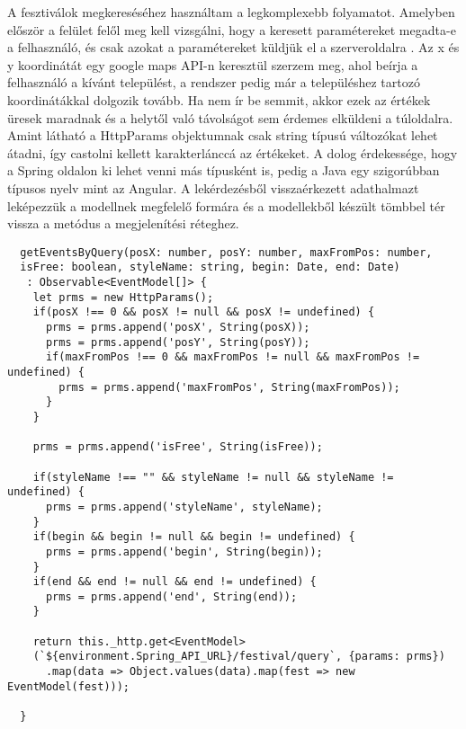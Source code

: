 

\begin{java}
\end{java}

A fesztiválok megkereséséhez használtam a legkomplexebb folyamatot. Amelyben először a felület felől meg kell vizsgálni, hogy a keresett paramétereket megadta-e a felhasználó, és csak azokat a paramétereket küldjük el a szerveroldalra . Az x és y koordinátát egy google maps API-n keresztül szerzem meg, ahol beírja a felhasználó a kívánt települést, a rendszer pedig már a településhez tartozó koordinátákkal dolgozik tovább. Ha nem ír be semmit, akkor ezek az értékek üresek maradnak és a helytől való távolságot sem érdemes elküldeni a túloldalra. Amint látható a HttpParams objektumnak csak string típusú változókat lehet átadni, így castolni kellett karakterlánccá az értékeket. A dolog érdekessége, hogy a Spring oldalon ki lehet venni más típusként is, pedig a Java egy szigorúbban típusos nyelv mint az Angular.
A lekérdezésből visszaérkezett adathalmazt leképezzük a modellnek megfelelő formára és a modellekből készült tömbbel tér vissza a metódus a megjelenítési réteghez.

\begin{verbatim}
  getEventsByQuery(posX: number, posY: number, maxFromPos: number, 
  isFree: boolean, styleName: string, begin: Date, end: Date)
   : Observable<EventModel[]> {
    let prms = new HttpParams();
    if(posX !== 0 && posX != null && posX != undefined) {
      prms = prms.append('posX', String(posX));
      prms = prms.append('posY', String(posY));
      if(maxFromPos !== 0 && maxFromPos != null && maxFromPos != undefined) {
        prms = prms.append('maxFromPos', String(maxFromPos));
      }
    }

    prms = prms.append('isFree', String(isFree));

    if(styleName !== "" && styleName != null && styleName != undefined) {
      prms = prms.append('styleName', styleName);
    }
    if(begin && begin != null && begin != undefined) {
      prms = prms.append('begin', String(begin));
    }
    if(end && end != null && end != undefined) {
      prms = prms.append('end', String(end));
    }

    return this._http.get<EventModel>
    (`${environment.Spring_API_URL}/festival/query`, {params: prms})
      .map(data => Object.values(data).map(fest => new EventModel(fest)));

  }
\end{verbatim}

